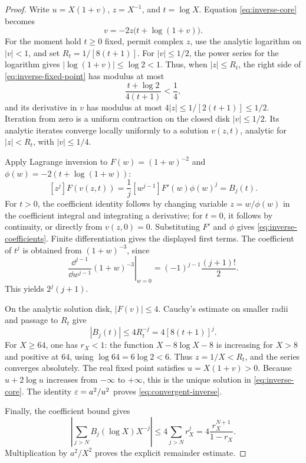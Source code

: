 \begin{proof}
Write \(u=X(1+v)\), \(z=X^{-1}\), and \(t=\log X\). Equation
\eqref{eq:inverse-core} becomes
\begin{equation}
 v=-2z\bigl(t+\log(1+v)\bigr).
 \label{eq:inverse-fixed-point}
\end{equation}
For the moment hold \(t\ge0\) fixed, permit complex \(z\), use the
analytic logarithm on \(|v|<1\), and set \(R_t=1/[8(t+1)]\).
For \(|v|\le1/2\), the power series for the logarithm gives
\( |\log(1+v)|\le\log2<1\). Thus, when \(|z|\le R_t\), the
right side of \eqref{eq:inverse-fixed-point} has modulus at most
\[
 \frac{t+\log2}{4(t+1)}<\frac14,
\]
and its derivative in \(v\) has modulus at most
\(4|z|\le1/[2(t+1)]\le1/2\). Iteration from zero is a uniform
contraction on the closed disk \(|v|\le1/2\). Its analytic iterates
converge locally uniformly to a solution \(v(z,t)\), analytic for
\(|z|<R_t\), with \(|v|\le1/4\).

Apply Lagrange inversion to
\(F(w)=(1+w)^{-2}\) and \(\phi(w)=-2(t+\log(1+w))\):
\[
 [z^j]F(v(z,t))
 =\frac1j[w^{j-1}]F'(w)\phi(w)^j=B_j(t).
\]
For \(t>0\), the coefficient identity follows by changing variable
\(z=w/\phi(w)\) in the coefficient integral and integrating a
derivative; for \(t=0\), it follows by continuity, or directly from
\(v(z,0)=0\). Substituting \(F'\) and \(\phi\) gives
\eqref{eq:inverse-coefficients}. Finite differentiation gives the
displayed first terms. The coefficient of \(t^j\) is obtained from
\((1+w)^{-3}\), since
\[
 \left.\frac{\dd^{j-1}}{\dd w^{j-1}}(1+w)^{-3}\right|_{w=0}
 =(-1)^{j-1}\frac{(j+1)!}{2}.
\]
This yields \(2^j(j+1)\).

On the analytic solution disk, \(|F(v)|\le4\). Cauchy's estimate
on smaller radii and passage to \(R_t\) give
\[
 |B_j(t)|\le4R_t^{-j}=4[8(t+1)]^j.
\]
For \(X\ge64\), one has \(r_X<1\): the function
\(X-8\log X-8\) is increasing for \(X>8\) and positive at
\(64\), using \(\log64=6\log2<6\). Thus \(z=1/X<R_t\),
and the series converges absolutely. The real fixed point satisfies
\(u=X(1+v)>0\). Because \(u+2\log u\) increases from
\(-\infty\) to \(+\infty\), this is the unique solution in
\eqref{eq:inverse-core}. The identity \(\varepsilon=a^2/u^2\) proves
\eqref{eq:convergent-inverse}.

Finally, the coefficient bound gives
\[
 \left|\sum_{j>N}B_j(\log X)X^{-j}\right|
 \le4\sum_{j>N}r_X^j=4\frac{r_X^{N+1}}{1-r_X}.
\]
Multiplication by \(a^2/X^2\) proves the explicit remainder estimate.
\end{proof}

